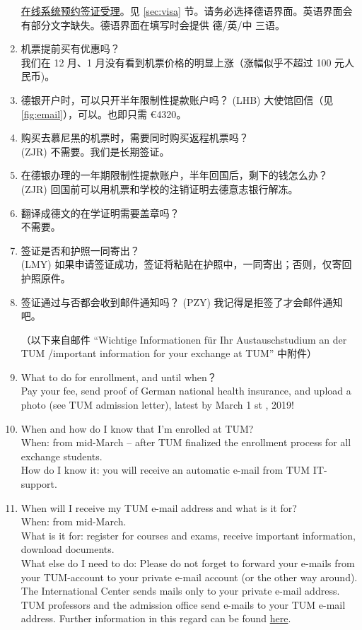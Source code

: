 \documentclass[oneside,final]{book}
\begin{document}
\begin{enumerate}
  \href{https://service2.diplo.de/rktermin/extern/choose_category.do?locationCode=peki&realmId=12&categoryId=156&request_locale=de}{在线系统预约签证受理}。见 \ref{sec:visa} 节。请务必选择德语界面。英语界面会有部分文字缺失。德语界面在填写时会提供 德/英/中 三语。
  \item 机票提前买有优惠吗？ \\
  我们在 12 月、1 月没有看到机票价格的明显上涨（涨幅似乎不超过 100 元人民币)。
  \item 德银开户时，可以只开半年限制性提款账户吗？
  (LHB) 大使馆回信（见 \ref{fig:email}），可以。也即只需 \euro{4320}。
  \item 购买去慕尼黑的机票时，需要同时购买返程机票吗？ \\
  (ZJR) 不需要。我们是长期签证。
  \item 在德银办理的一年期限制性提款账户，半年回国后，剩下的钱怎么办？ \\
  (ZJR) 回国前可以用机票和学校的注销证明去德意志银行解冻。
  \item 翻译成德文的在学证明需要盖章吗？ \\
  不需要。
  \item 签证是否和护照一同寄出？ \\
  (LMY) 如果申请签证成功，签证将粘贴在护照中，一同寄出；否则，仅寄回护照原件。
  \item 签证通过与否都会收到邮件通知吗？
  (PZY) 我记得是拒签了才会邮件通知吧。

  （以下来自邮件 ``Wichtige Informationen für Ihr Austauschstudium an der TUM /important information for your exchange at TUM'' 中附件）
  \item What to do for enrollment, and until when？ \\
  Pay your fee, send proof of German national health insurance, and upload a photo
  (see TUM admission letter), latest by March 1 st , 2019!
  \item When and how do I know that I’m enrolled at TUM? \\
  When: from mid-March – after TUM finalized the enrollment process for all exchange students. \\
  How do I know it: you will receive an automatic e-mail from TUM IT-support.
  \item When will I receive my TUM e-mail address and what is it for? \\
  When: from mid-March. \\
  What is it for: register for courses and exams, receive important information, download documents. \\
  What else do I need to do: Please do not forget to forward your e-mails from your TUM-account to your
  private e-mail account (or the other way around). The International Center sends mails only to your private
  e-mail address. TUM professors and the admission office send e-mails to your TUM e-mail address. Further
  information in this regard can be found \href{http://www.it.tum.de/en/faq/it-services/e-mail/}{here}.
\end{enumerate}
\end{document}
